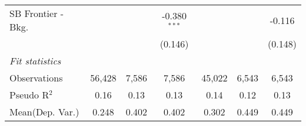 \begin{tabular}{lcccccc}
   SB Frontier - Bkg.   &                &                & -0.380$^{***}$ &                &               & -0.116\\   
                        &                &                & (0.146)        &                &               & (0.148)\\   
   \midrule
   \emph{Fit statistics}\\
   Observations         & 56,428         & 7,586          & 7,586          & 45,022         & 6,543         & 6,543\\  
   Pseudo R$^2$         & 0.16           & 0.13           & 0.13           & 0.14           & 0.12          & 0.13\\  
Mean(Dep. Var.) & 0.248 & 0.402 & 0.402 & 0.302 & 0.449 & 0.449 \\
   

\end{tabular}
